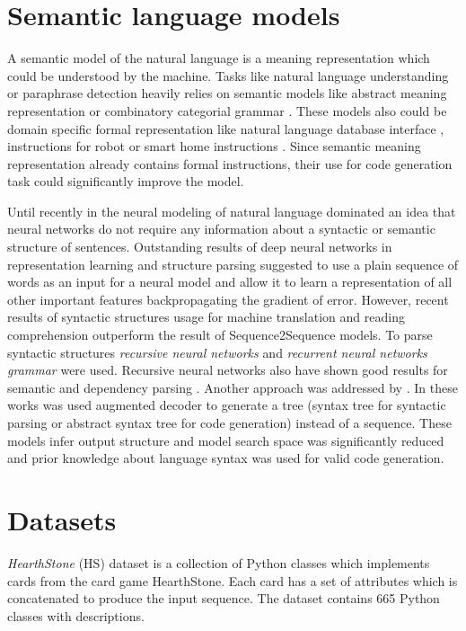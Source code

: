 \section{Semantic language models}
A semantic model of the natural language is a meaning representation which could be understood by the machine. Tasks like natural language understanding or paraphrase detection heavily relies on semantic models like abstract meaning representation \parencite{banarescu2013abstract} or combinatory categorial grammar \parencite{Clark2007}. These models also could be domain specific formal representation like natural language database interface \parencite{Zettlemoyer2012, berant2013semantic}, instructions for robot \parencite{artzi2013weakly} or smart home instructions \parencite{quirk2015language}. Since semantic meaning representation already contains formal instructions, their use for code generation task could significantly improve the model. 

Until recently in the neural modeling of natural language dominated an idea that neural networks do not require any information about a syntactic or semantic structure of sentences. Outstanding results of deep neural networks in representation learning and structure parsing suggested to use a plain sequence of words as an input for a neural model and allow it to learn a representation of all other important features backpropagating the gradient of error. However, recent results of syntactic structures usage for machine translation \parencite{Chen2017} and reading comprehension \parencite{xie2017constituent} outperform the result of Sequence2Sequence models. To parse syntactic structures \emph{recursive neural networks} \parencite{Goller, socher2011parsing} and \emph{recurrent neural networks grammar} \parencite{Dyer2016} were used. Recursive neural networks also have shown good results for semantic \parencite{Tai2015} and dependency parsing \parencite{Zhu2015}. Another approach was addressed by \cite{Dong2016, Yin2017, Rabinovich2017}. In these works was used augmented decoder to generate a tree (syntax tree for syntactic parsing or abstract syntax tree for code generation) instead of a sequence. These models infer output structure and model search space was significantly reduced and prior knowledge about language syntax was used for valid code generation.

\section{Datasets}
\emph{HearthStone} (HS) dataset \parencite{Ling2016} is a collection of Python classes which implements cards from the card game HearthStone. Each card has a set of attributes which is concatenated to produce the input sequence. The dataset contains 665 Python classes with descriptions.

